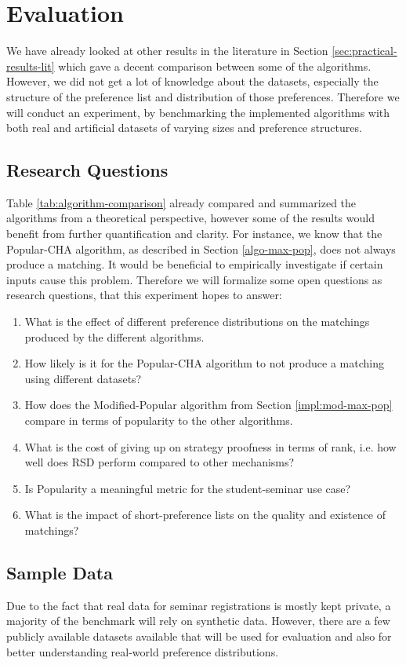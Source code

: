 \section{Evaluation}\label{sec:evaluation}
We have already looked at other results in the literature in Section \ref{sec:practical-results-lit} which gave a decent comparison between some of the algorithms. However, we did not get a lot of knowledge about the datasets, especially the structure of the preference list and distribution of those preferences. Therefore we will conduct an experiment, by benchmarking the implemented algorithms with both real and artificial datasets of varying sizes and preference structures.

\subsection{Research Questions}\label{sec:research-q}
Table \ref{tab:algorithm-comparison} already compared and summarized the algorithms from a theoretical perspective, however some of the results would benefit from further quantification and clarity. For instance, we know that the Popular-CHA algorithm, as described in Section \ref{algo-max-pop}, does not always produce a matching. It would be beneficial to empirically investigate if certain inputs cause this problem. Therefore we will formalize some open questions as research questions, that this experiment hopes to answer:
\begin{enumerate}
    \item What is the effect of different preference distributions on the matchings produced by the different algorithms.
    \item How likely is it for the Popular-CHA algorithm to not produce a matching using different datasets?
    \item How does the Modified-Popular algorithm from Section \ref{impl:mod-max-pop} compare in terms of popularity to the other algorithms.
    \item What is the cost of giving up on strategy proofness in terms of rank, i.e. how well does RSD perform compared to other mechanisms?
    \item Is Popularity a meaningful metric for the student-seminar use case?
    \item What is the impact of short-preference lists on the quality and existence of matchings?
\end{enumerate}

\subsection{Sample Data}
Due to the fact that real data for seminar registrations is mostly kept private, a majority of the benchmark will rely on synthetic data. However, there are a few publicly available datasets available that will be used for evaluation and also for better understanding real-world preference distributions.

